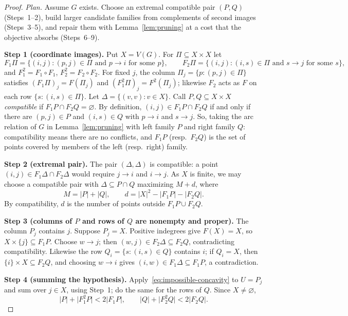 \documentclass[11pt]{article}
\theoremstyle{remark}
\newcommand{\abs}[1]{\lvert #1\rvert}
\newcommand{\step}[1]{\par\smallskip\noindent\textbf{Step #1.}}
\begin{document}
\begin{proof}
\emph{Plan.} Assume $G$ exists. Choose an extremal compatible pair $(P,Q)$
(Steps~1--2), build larger candidate families from complements of second
images (Steps~3--5), and repair them with Lemma~\ref{lem:pruning} at a cost
that the objective absorbs (Steps~6--9).

\step{1 (coordinate images)} Put $X=V(G)$. For $\Pi\subseteq X\times X$ let
\[
 F_1\Pi=\{(i,j):(p,j)\in\Pi\text{ and }p\to i\text{ for some }p\},\qquad
 F_2\Pi=\{(i,j):(i,s)\in\Pi\text{ and }s\to j\text{ for some }s\},
\]
and $F_1^2=F_1\circ F_1$, $F_2^2=F_2\circ F_2$. For fixed $j$, the column
$\Pi_j=\{p:(p,j)\in\Pi\}$ satisfies $(F_1\Pi)_j=F(\Pi_j)$ and
$(F_1^2\Pi)_j=F^2(\Pi_j)$; likewise $F_2$ acts as $F$ on each row
$\{s:(i,s)\in\Pi\}$. Let $\Delta=\{(v,v):v\in X\}$. Call $P,Q\subseteq X\times X$
\emph{compatible} if $F_1P\cap F_2Q=\varnothing$. By definition,
$(i,j)\in F_1P\cap F_2Q$ if and only if there are $(p,j)\in P$ and
$(i,s)\in Q$ with $p\to i$ and $s\to j$. So, taking the arc relation of $G$ in
Lemma~\ref{lem:pruning} with left family $P$ and right family $Q$:
compatibility means there are no conflicts, and $F_1P$ (resp.\ $F_2Q$) is the
set of points covered by members of the left (resp.\ right) family.

\step{2 (extremal pair)} The pair $(\Delta,\Delta)$ is compatible: a point
$(i,j)\in F_1\Delta\cap F_2\Delta$ would require $j\to i$ and $i\to j$. As $X$
is finite, we may choose a compatible pair with $\Delta\subseteq P\cap Q$
maximizing $M+d$, where
\[
 M=\abs{P}+\abs{Q},\qquad d=\abs{X}^2-\abs{F_1P}-\abs{F_2Q}.
\]
By compatibility, $d$ is the number of points outside $F_1P\cup F_2Q$.

\step{3 (columns of $P$ and rows of $Q$ are nonempty and proper)} The column
$P_j$ contains $j$. Suppose $P_j=X$. Positive indegrees give $F(X)=X$, so
$X\times\{j\}\subseteq F_1P$. Choose $w\to j$; then
$(w,j)\in F_2\Delta\subseteq F_2Q$, contradicting compatibility. Likewise the
row $Q_i=\{s:(i,s)\in Q\}$ contains $i$; if $Q_i=X$, then
$\{i\}\times X\subseteq F_2Q$, and choosing $w\to i$ gives
$(i,w)\in F_1\Delta\subseteq F_1P$, a contradiction.

\step{4 (summing the hypothesis)} Apply~\eqref{eq:impossible-concavity} to
$U=P_j$ and sum over $j\in X$, using Step~1; do the same for the rows of $Q$.
Since $X\ne\varnothing$,
\begin{equation}\label{eq:strict-fiber-sums}
 \abs{P}+\abs{F_1^2P}<2\abs{F_1P},\qquad\abs{Q}+\abs{F_2^2Q}<2\abs{F_2Q}.
\end{equation}


\end{proof}
\end{document}
